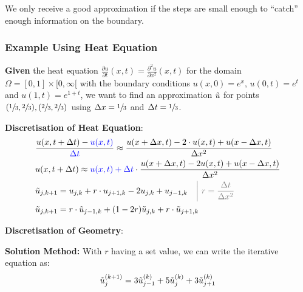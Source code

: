 We only receive a good approximation if the steps are small enough to ``catch'' enough information on the boundary.

\subsubsection{Example Using Heat Equation}

\textbf{Given} the heat equation $\frac{\partial u}{\partial t}(x,t) = \frac{\partial^2 u}{\partial x^2}(x,t)$
for the domain $\Omega = [0,1]\times [0, \infty[$ with the boundary conditions
$u(x,0) = e^x$, $u(0,t) = e^t$ and $u(1,t) = e^{1+t}$, we want to find an approximation $\tilde{u}$ for points
$(\sfrac{1}{3},\sfrac{2}{3}),(\sfrac{2}{3},\sfrac{2}{3})$ using $\Delta x = \sfrac{1}{3}$ and $\Delta t = \sfrac{1}{3}$.

\textbf{Discretisation of Heat Equation}:
\begin{align*}
	& \frac{u(x,t+\Delta t)-{\color{blue} u(x,t)}}{\color{blue}\Delta t}\approx\frac{u(x+\Delta x,t)-2\cdot u(x,t)+u(x-\Delta x,t)}{\Delta x^{2}} \\
	& u(x,t+\Delta t)\approx {\color{blue}u(x,t)+\Delta t}\cdot{\frac{u(x+\Delta x,t)-2 u(x,t)+u(x-\Delta x,t)}{\Delta x^{2}}} \\
	& \utild_{j,k+1}=u_{j,k}+r\cdot u_{j+1,k} - 2u_{j,k} + u_{j-1,k}\quad {\color{gray}\left|\ r=\frac{\Delta t}{\Delta x^2}\right.} \\
	& \utild_{j,k+1} = r\cdot\utild_{j-1,k}+(1-2r)\utild_{j,k} + r\cdot\utild_{j+1,k}
\end{align*}

\textbf{Discretisation of Geometry}:


\textbf{Solution Method:} With $r$ having a set value, we can write the iterative equation as:
\begin{align*}
	\tilde{u}_{j}^{(k+1)} = 3\tilde{u}_{j-1}^{(k)} + 5\tilde{u}_{j}^{(k)} + 3\tilde{u}_{j+1}^{(k)}
\end{align*}

